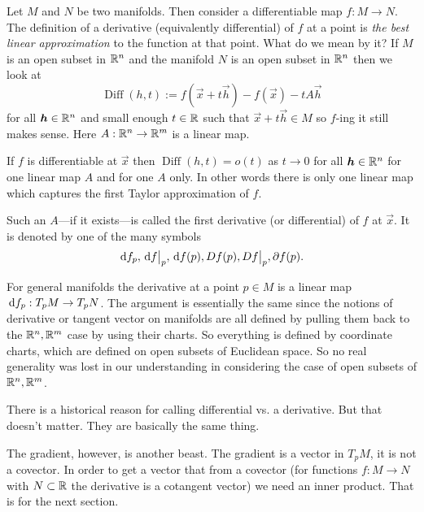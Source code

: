 \documentclass[12pt]{amsart}
\begin{document}
Let $M$ and $N$ be two manifolds. Then consider a differentiable map $f: M\to N$. The definition of a derivative (equivalently differential) of $f$ at a point is \emph{the best linear approximation} to the function at that point. What do we mean by it? If $M$ is an open subset in $\mathbb{R}^n$ and the manifold $N$ is an open subset in $\mathbb{R}^n$ then we look at
\begin{equation}\label{eq:derivativeDifference}
	\operatorname{Diff}(h,t) := f(\vec{x} + t \vec{h}) - f(\vec{x}) - tA\vec{h}
\end{equation}
for all $\mathbf{\boldsymbol{h}}\in \mathbb{R}^n$ and small enough $t\in \mathbb{R}$ such that $\vec{x} + t\vec{h}\in M$ so $f$-ing it still makes sense. Here  $A: \mathbb{R}^n \to \mathbb{R}^m$ is a linear map.

If $f$ is differentiable at $\vec{x}$  then $\operatorname{Diff}(h,t) = o(t)$ as $t\to 0$ for all $\mathbf{\boldsymbol{h}} \in \mathbb{R}^n$ for one linear map $A$ and for one $A$ only. In other words there is only one linear map which captures the first Taylor approximation of $f$. 

Such an $A$---if it exists---is called the first derivative (or differential) of $f$ at $\vec{x}$. It is denoted by one of the many symbols
\[
	\,\mathrm{d} f_p, \,\mathrm{d} f\big|_p, \,\mathrm{d} f(p), Df(p), Df\big|_p, \partial f(p) .
\]

For general manifolds the derivative at a point $p \in M$ is a linear map $\,\mathrm{d} f_p : T_p M \to T_p N$. The argument is essentially the same since the notions of derivative or tangent vector on manifolds are all defined by pulling them back to the $\mathbb{R}^n, \mathbb{R}^m$ case by using their charts. So everything is defined by coordinate charts, which are defined on open subsets of Euclidean space. So no real generality was lost in our understanding in considering the case of open subsets of  $\mathbb{R}^n, \mathbb{R}^m$. 

There is a historical reason for calling  differential vs. a derivative. But that doesn't matter. They are basically the same thing. 

The gradient, however, is another beast. The gradient is a vector in $T_pM$, it is not a covector. In order to get a vector that from a covector (for functions $f: M\to N$ with $N \subset \mathbb{R}$ the derivative is a cotangent vector) we need an inner product. That is for the next section.
\end{document}

